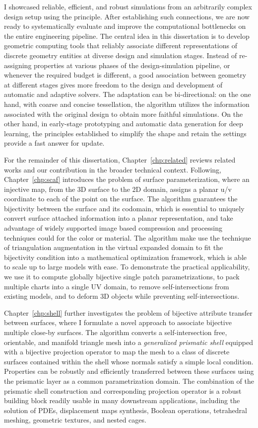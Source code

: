 I showcased reliable, efficient, and robust simulations from an arbitrarily complex design setup using the principle. After establishing such connections, we are now ready to systematically evaluate and improve the computational bottlenecks on the entire engineering pipeline.
The central idea in this dissertation is to develop geometric computing tools that reliably associate different representations of discrete geometry entities at diverse design and simulation stages. 
Instead of re-assigning properties at various phases of the design-simulation pipeline, or whenever the required budget is different, a good association between geometry at different stages gives more freedom to the design and development of automatic and adaptive solvers. The adaptation can be bi-directional: on the one hand, with coarse and concise tessellation, the algorithm utilizes the information associated with the original design to obtain more faithful simulations. On the other hand, in early-stage prototyping and automatic data generation for deep learning, the principles established to simplify the shape and retain the settings provide a fast answer for update. 

For the remainder of this dissertation, Chapter~\ref*{chp:related} reviews related works and our contribution in the broader technical context. 
Following, Chapter~\ref*{chp:scaf} introduces the problem of surface parameterization, where an injective map, from the 3D surface to the 2D domain, assigns a planar u/v coordinate to each of the point on the surface. The algorithm guarantees the bijectivity between the surface and its codomain, which is essential to uniquely convert surface attached information into a planar representation, and take advantage of widely supported image based compression and processing techniques could for the color or material. 
The algorithm make use the technique of triangulation augmentation in the virtual expanded domain to fit the bijectivity condition into a mathematical optimization framework, which is able to scale up to large models with ease. 
To demonstrate the practical applicability, we use it to compute globally bijective single patch parametrizations, to pack multiple charts into a single UV domain, to remove self-intersections from existing models, and to deform 3D objects while preventing self-intersections.

Chapter~\ref*{chp:shell} further investigates the problem of bijective attribute transfer between surfaces, where I formulate a novel approach to associate bijective multiple close-by surfaces. The algorithm converts a self-intersection free, orientable, and manifold triangle mesh into a \emph{generalized prismatic shell} equipped with a bijective projection operator to map the mesh to a class of discrete surfaces contained within the shell whose normals satisfy a simple local condition. 
Properties can be robustly and efficiently transferred between these surfaces using the prismatic layer as a common parametrization domain. 
The combination of the prismatic shell construction and corresponding projection operator is a robust building block readily usable in many downstream applications, including the solution of PDEs, displacement maps synthesis, Boolean operations, tetrahedral meshing, geometric textures, and nested cages.


